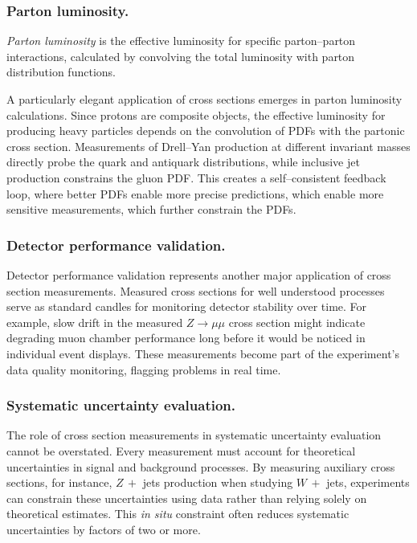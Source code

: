         \subsubsection{Parton luminosity.}
            \begin{definition}
                \emph{Parton luminosity} is the effective luminosity for specific parton--parton interactions, calculated by convolving the total luminosity with parton distribution functions.
            \end{definition}
            A particularly elegant application of cross sections emerges in parton luminosity calculations.
            Since protons are composite objects, the effective luminosity for producing heavy particles depends on the convolution of PDFs with the partonic cross section.
            Measurements of Drell--Yan production at different invariant masses directly probe the quark and antiquark distributions, while inclusive jet production constrains the gluon PDF.
            This creates a self--consistent feedback loop, where better PDFs enable more precise predictions, which enable more sensitive measurements, which further constrain the PDFs.
            
        \subsubsection{Detector performance validation.}
             Detector performance validation represents another major application of cross section measurements.
             Measured cross sections for well understood processes serve as standard candles for monitoring detector stability over time.
             For example, slow drift in the measured \(Z\to\mu\mu\) cross section might indicate degrading muon chamber performance long before it would be noticed in individual event displays.
             These measurements become part of the experiment's data quality monitoring, flagging problems in real time.
            \subsubsection{Systematic uncertainty evaluation.}
                The role of cross section measurements in systematic uncertainty evaluation cannot be overstated.
                Every measurement must account for theoretical uncertainties in signal and background processes.
                By measuring auxiliary cross sections, for instance, \(Z\, +\) jets production when studying \(W\, +\) jets, experiments can constrain these uncertainties using data rather than relying solely on theoretical estimates.
                This \textit{in situ} constraint often reduces systematic uncertainties by factors of two or more.
